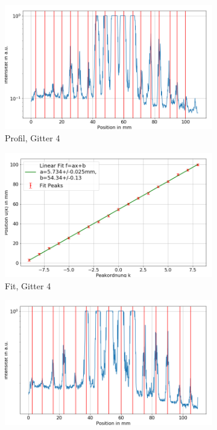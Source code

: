\documentclass[
	a4paper,
	12pt,
	pagesize,
	ngerman
]{scrartcl}
\begin{document}
	\begin{figure}[H]
        \centering

				\begin{subfigure}[b]{0.475\textwidth}
            \centering
            \includegraphics[width=\textwidth]{img/2/2_gitter_g4}
            \caption%
            {Profil, Gitter 4}
            \label{fig_2_profil_g4}
        \end{subfigure}
        \hfill
        \begin{subfigure}[b]{0.475\textwidth}
            \centering
            \includegraphics[width=\textwidth]{img/2/2_gitter_g4_fit}
            \caption[]%
            {Fit, Gitter 4}
            \label{fig_2_fit_g4}
        \end{subfigure}
        \begin{subfigure}[b]{0.475\textwidth}
            \centering
            \includegraphics[width=\textwidth]{img/2/2_gitter_g5}

\end{subfigure}
\end{figure}
\end{document}
